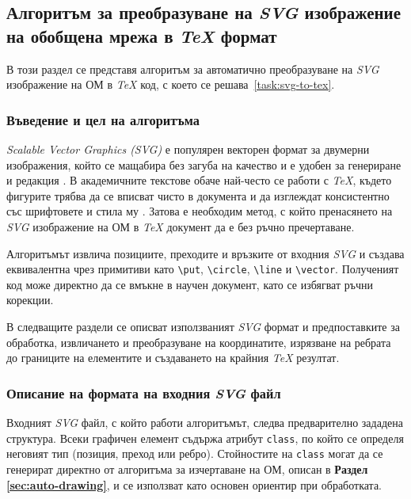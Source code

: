 \subsection{Алгоритъм за преобразуване на \textit{SVG} изображение на обобщена мрежа в \textit{TeX} формат}

\hspace*{2.5em}В този раздел се представя алгоритъм за автоматично преобразуване на \textit{SVG} изображение на ОМ в \textit{TeX} код, с което се решава~\ref{task:svg-to-tex}.

\subsubsection{Въведение и цел на алгоритъма}
\hspace*{2.5em}\textit{Scalable Vector Graphics (SVG)} е популярен векторен формат за двумерни изображения, който се мащабира без загуба на качество и е удобен за генериране и редакция \cite{SVG_F}. В академичните текстове обаче най-често се работи с \textit{TeX}, където фигурите трябва да се вписват чисто в документа и да изглеждат консистентно със шрифтовете и стила му \cite{Knuth1986TeXProgram}. Затова е необходим метод, с който пренасянето на \textit{SVG} изображение на ОМ в \textit{TeX} документ да е без ръчно пречертаване.

Алгоритъмът извлича позициите, преходите и връзките от входния \textit{SVG} и създава еквивалентна чрез примитиви като \texttt{\textbackslash put}, \texttt{\textbackslash circle}, \texttt{\textbackslash line} и \texttt{\textbackslash vector}. Полученият код може директно да се вмъкне в научен документ, като се избягват ръчни корекции.

В следващите раздели се описват използваният \textit{SVG} формат и предпоставките за обработка, извличането и преобразуване на координатите, изрязване на ребрата до границите на елементите и създаването на крайния \textit{TeX} резултат.


\subsubsection{Описание на формата на входния \textit{SVG} файл}
\hspace*{2.5em}Входният \textit{SVG} файл, с който работи алгоритъмът, следва предварително зададена структура. Всеки графичен елемент съдържа атрибут \texttt{class}, по който се определя неговият тип (позиция, преход или ребро). Стойностите на \texttt{class} могат да се генерират директно от алгоритъма за изчертаване на ОМ, описан в \textbf{Раздел \ref{sec:auto-drawing}}, и се използват като основен ориентир при обработката.

